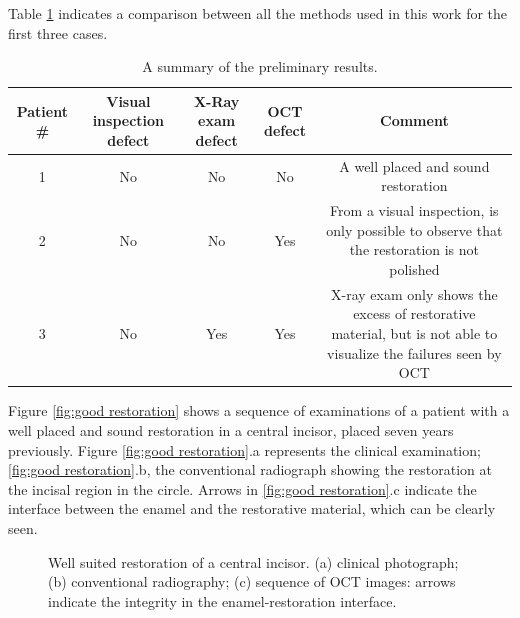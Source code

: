 \documentclass[12pt,twoside,english]{book}
\renewcommand{\~}{\perispomeni}%
\providecommand{\tabularnewline}{\\}
\numberwithin{equation}{section}
\numberwithin{figure}{section}
\begin{document}
Table \ref{table:preliminary results} indicates a comparison between all the methods used in this work for the first three cases.
\begin{table}[H]
\noindent \begin{centering}
\begin{tabular}{ccccc}
\hline 
Patient \# & %
\begin{minipage}[t]{0.15\linewidth}%
Visual inspection defect%
\end{minipage} & %
\begin{minipage}[t]{0.15\linewidth}%
X-Ray exam defect%
\end{minipage} & %
\begin{minipage}[t]{0.1\linewidth}%
OCT defect%
\end{minipage} & Comment\tabularnewline
\hline
\hline 
1 & No & No & No & %
\begin{minipage}[t]{0.4\linewidth}%
A well placed and sound restoration%
\end{minipage}\tabularnewline
2 & No & No & Yes & %
\begin{minipage}[t]{0.4\linewidth}%
From a visual inspection, is only possible to observe that the restoration
is not polished%
\end{minipage}\tabularnewline
3 & No & Yes & Yes & %
\begin{minipage}[t]{0.4\linewidth}%
X-ray exam only shows the excess of restorative material, but is not
able to visualize the failures seen by OCT%
\end{minipage}\tabularnewline
\hline
\end{tabular}\caption{A summary of the preliminary results.\label{table:preliminary results}}
\par\end{centering}
\end{table}

Figure \ref{fig:good restoration} shows a sequence of examinations of a patient with a well placed and sound restoration in a central incisor, placed seven years previously. Figure \ref{fig:good restoration}.a represents the clinical examination; \ref{fig:good restoration}.b, the conventional radiograph showing the restoration at the incisal region in the circle. Arrows in \ref{fig:good restoration}.c indicate the interface between the enamel and the restorative material, which can be clearly seen.
\begin{figure}[h]
\noindent \centering{}
\caption{Well suited restoration of a central incisor. (a) clinical photograph; (b) conventional radiography; (c) sequence of OCT images: arrows indicate the integrity in the enamel-restoration interface.}
\end{figure}
\end{document}
